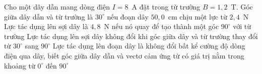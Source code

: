 	\begin{ex}%
		Cho một dây dẫn mang dòng điện $I=8$~A đặt trong từ trường $B=1{,}2$~T.
		\choiceTFt
		{\True Góc giữa dây dẫn và từ trường là $30^\circ$ nếu đoạn dây $50{,}0$~cm chịu một lực từ $2{,}4$~N}
		{\True Lực tác dụng lên sợi dây là $4{,}8$~N nếu nó quay để tạo thành một góc $90^\circ$ với từ trường}
		{Lực tác dụng lên sợi dây không đổi khi góc giữa dây và từ trường thay đổi từ $30^\circ$ sang $90^\circ$}
		{Lực tác dụng lên đoạn dây là không đổi bất kể cường độ dòng điện qua dây, biết góc giữa dây dẫn và vectơ cảm ứng từ có giá trị nằm trong khoảng từ $0^\circ$ đến $90^\circ$}
	\end{ex}

